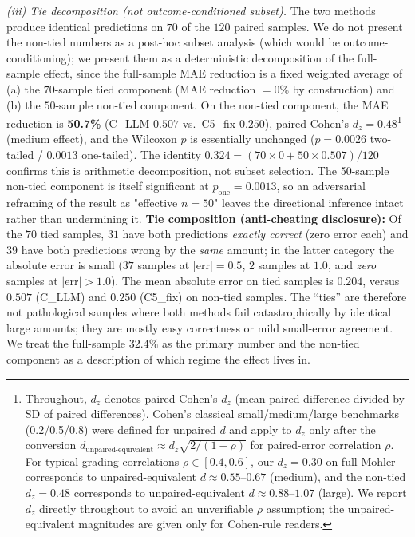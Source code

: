 \documentclass[conference]{IEEEtran}
\begin{document}
\emph{(iii) Tie decomposition (not outcome-conditioned subset).} The two
methods produce identical predictions on $70$ of the $120$ paired samples.
We do not present the non-tied numbers as a post-hoc subset analysis (which
would be outcome-conditioning); we present them as a deterministic
decomposition of the full-sample effect, since the full-sample MAE
reduction is a fixed weighted average of (a) the $70$-sample tied
component (MAE reduction $= 0\%$ by construction) and (b) the $50$-sample
non-tied component. On the non-tied component, the MAE reduction is
\textbf{50.7\%} (C\_LLM $0.507$ vs.\ C5\_fix $0.250$), paired Cohen's
$d_z = 0.48$\footnote{Throughout, $d_z$ denotes paired Cohen's $d_z$
(mean paired difference divided by SD of paired differences). Cohen's
classical small/medium/large benchmarks (0.2/0.5/0.8) were defined for
unpaired $d$ and apply to $d_z$ only after the conversion
$d_{\text{unpaired-equivalent}} \approx d_z \sqrt{2/(1-\rho)}$ for
paired-error correlation $\rho$. For typical grading correlations
$\rho \in [0.4, 0.6]$, our $d_z = 0.30$ on full Mohler corresponds to
unpaired-equivalent $d \approx 0.55$--$0.67$ (medium), and the non-tied
$d_z = 0.48$ corresponds to unpaired-equivalent $d \approx 0.88$--$1.07$
(large). We report $d_z$ directly throughout to avoid an unverifiable
$\rho$ assumption; the unpaired-equivalent magnitudes are given only for
Cohen-rule readers.} (medium effect), and the Wilcoxon $p$ is essentially
unchanged ($p = 0.0026$ two-tailed / $0.0013$ one-tailed). The
identity $0.324 = (70 \times 0 + 50 \times 0.507) / 120$ confirms this is
arithmetic decomposition, not subset selection. The 50-sample non-tied
component is itself significant at $p_{\text{one}} = 0.0013$, so an
adversarial reframing of the result as "effective $n = 50$" leaves the
directional inference intact rather than undermining it. \textbf{Tie
composition (anti-cheating disclosure):} Of the $70$ tied samples,
$31$ have both predictions \emph{exactly correct} (zero error each) and
$39$ have both predictions wrong by the \emph{same} amount; in the
latter category the absolute error is small ($37$ samples at
$|\text{err}| = 0.5$, $2$ samples at $1.0$, and \emph{zero} samples at
$|\text{err}| > 1.0$). The mean absolute error on tied samples is $0.204$,
versus $0.507$ (C\_LLM) and $0.250$ (C5\_fix) on non-tied samples. The
``ties'' are therefore not pathological samples where both methods fail
catastrophically by identical large amounts; they are mostly easy
correctness or mild small-error agreement. We treat the
full-sample $32.4\%$ as the primary number and the non-tied component as
a description of which regime the effect lives in.
\end{document}
